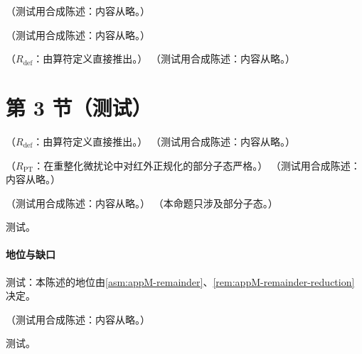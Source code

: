 \begin{example}[自由夸克的前向振幅]\label{ex:dis-free-quark}
（测试用合成陈述：内容从略。）
\end{example}

\begin{definition}[扭度与扭度 2 算符]\label{def:dis-twist}
（测试用合成陈述：内容从略。）
\end{definition}

\begin{lemma}\label{lem:dis-twist-classification}
（$R_{\mathrm{def}}$：由算符定义直接推出。）
（测试用合成陈述：内容从略。）
\end{lemma}

\section{第 3 节（测试）}\label{sec:dis-ope}

\begin{lemma}\label{lem:dis-twist-chirality}
（$R_{\mathrm{def}}$：由算符定义直接推出。）
（测试用合成陈述：内容从略。）
\end{lemma}

\begin{lemma}\label{lem:dis-tree-ope}
（$R_{\mathrm{PT}}$：在重整化微扰论中对红外正规化的部分子态严格。）
（测试用合成陈述：内容从略。）
\end{lemma}

\begin{proposition}\label{prop:dis-ope-euclid}
（测试用合成陈述：内容从略。）
（本命题只涉及部分子态。）
\end{proposition}
\begin{proofsketch}测试。\end{proofsketch}
\paragraph{地位与缺口}测试：本陈述的地位由\cref{asm:appM-remainder}、\cref{rem:appM-remainder-reduction}决定。

\begin{proposition}\label{prop:dis-ope-gi}
（测试用合成陈述：内容从略。）
\end{proposition}
\begin{proofsketch}测试。\end{proofsketch}
